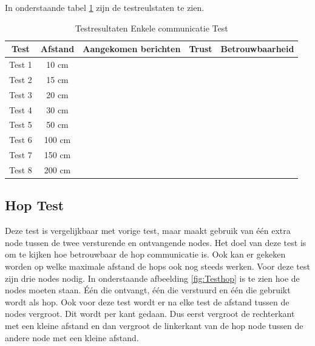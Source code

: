 In onderstaande tabel \ref{Test:EnkelCom} zijn de testreulstaten te zien.
\begin{table}[h]
    \centering
    \begin{tabular}{|c||c|c|c|c|}
        \hline
        Test    & Afstand   & Aangekomen berichten  & Trust & Betrouwbaarheid   \\\hline\hline
        Test 1  & 10 cm     &                       &       &                   \\\hline
        Test 2  & 15 cm     &                       &       &                   \\\hline
        Test 3  & 20 cm     &                       &       &                   \\\hline
        Test 4  & 30 cm     &                       &       &                   \\\hline
        Test 5  & 50 cm     &                       &       &                   \\\hline
        Test 6  & 100 cm    &                       &       &                   \\\hline
        Test 7  & 150 cm    &                       &       &                   \\\hline
        Test 8  & 200 cm    &                       &       &                   \\\hline   
    \end{tabular}
    \caption{Testresultaten Enkele communicatie Test}
    \label{Test:EnkelCom}
\end{table}

\subsection{Hop Test}
Deze test is vergelijkbaar met vorige test, maar maakt gebruik van één extra node tussen de twee versturende en ontvangende nodes. 
Het doel van deze test is om te kijken hoe betrouwbaar de hop communicatie is. Ook kan er gekeken worden op welke maximale afstand 
de hops ook nog steeds werken. 
Voor deze test zijn drie nodes nodig. In onderstaande afbeelding \ref{fig:Testhop} is te zien hoe de nodes moeten staan.
 Één die ontvangt, één die verstuurd en één die gebruikt wordt als hop. Ook voor deze test wordt er na elke test 
 de afstand tussen de nodes vergroot. Dit wordt per kant gedaan. Dus eerst vergroot de rechterkant met een kleine afstand 
en dan vergroot de linkerkant van de hop node tussen de andere node met een kleine afstand.

